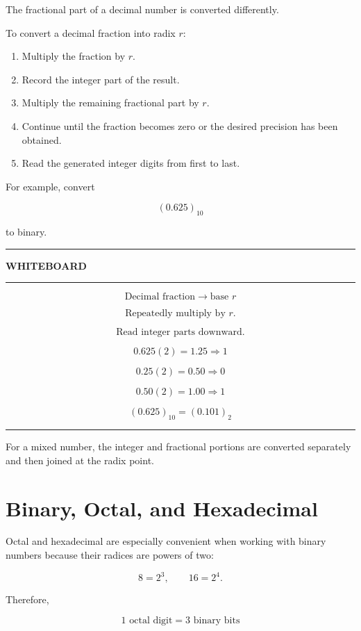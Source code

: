 \documentclass[11pt]{article}
\newenvironment{whiteboard}
{
    \par\medskip
    \begin{center}
    \begin{minipage}{0.94\textwidth}
    \hrule
    \vspace{0.4em}
    \textbf{\large WHITEBOARD}
    \vspace{0.3em}
    \hrule
    \vspace{0.7em}
}
{
    \vspace{0.5em}
    \hrule
    \end{minipage}
    \end{center}
    \medskip
}
\begin{document}
The fractional part of a decimal number is converted differently.

To convert a decimal fraction into radix \(r\):

\begin{enumerate}
    \item Multiply the fraction by \(r\).
    \item Record the integer part of the result.
    \item Multiply the remaining fractional part by \(r\).
    \item Continue until the fraction becomes zero or the desired precision
    has been obtained.
    \item Read the generated integer digits from first to last.
\end{enumerate}

For example, convert

\[
(0.625)_{10}
\]

to binary.

\begin{whiteboard}
\[
\boxed{\text{Decimal fraction}\rightarrow\text{base }r}
\]

\[
\text{Repeatedly multiply by }r.
\]

\[
\text{Read integer parts downward.}
\]

\[
0.625(2)=1.25\Rightarrow1
\]

\[
0.25(2)=0.50\Rightarrow0
\]

\[
0.50(2)=1.00\Rightarrow1
\]

\[
\boxed{(0.625)_{10}=(0.101)_2}
\]
\end{whiteboard}

For a mixed number, the integer and fractional portions are converted
separately and then joined at the radix point.

\section{Binary, Octal, and Hexadecimal}

Octal and hexadecimal are especially convenient when working with binary
numbers because their radices are powers of two:

\[
8=2^3,
\qquad
16=2^4.
\]

Therefore,

\[
\boxed{1\text{ octal digit}=3\text{ binary bits}}
\]
\end{document}
